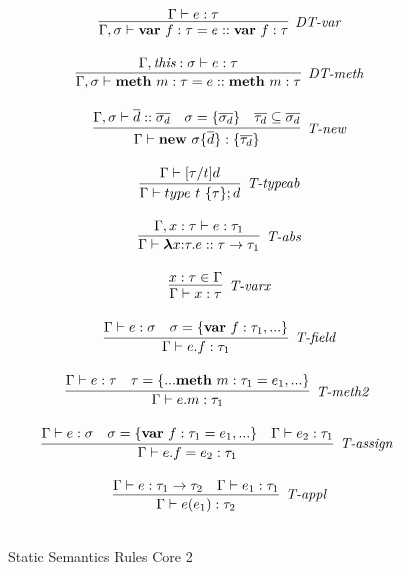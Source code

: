 \begin{figure}
\centering
\[
\begin{array}{c}
\infer[\textit{DT-var}]
	{\Gamma,\sigma \vdash \keyw{var}~ f:\tau = e :: \keyw{var}~ f:\tau }
	{\Gamma \vdash e : \tau} \\[3ex]
	
\infer[\textit{DT-meth}]
	{\Gamma,\sigma \vdash \keyw{meth}~ m:\tau = e :: \keyw{meth}~ m:\tau }
	{\Gamma,\textit{this}:\sigma \vdash e : \tau} \\[3ex]

\infer[\textit{T-new}]
	{\Gamma \vdash \keyw{new}~\sigma \{ \overline{d} \} : \{ \overline{\tau_d} \}}
	{\Gamma,\sigma \vdash \overline{d} :: \overline{\sigma_d} & \sigma = \{ \overline{\sigma_d} \} & \overline{\tau_d} \subseteq \overline{\sigma_d}} \\[3ex]

\infer[\textit{T-typeab}]
	{\Gamma \vdash  type~ t~\{\tau\}; d} 
	{\Gamma \vdash [\tau/t]d }\\[3ex]
	
\infer[\textit{T-abs}]
	{\Gamma \vdash  \boldsymbol\lambda x{:}\tau . e :: \tau \rightarrow \tau_1} 
	{\Gamma, x:\tau \vdash e:\tau_1 }\\[3ex]

\infer[\textit{T-varx}]
	{\Gamma \vdash x:\tau} 
	{x:\tau \in \Gamma }\\[3ex]

\infer[\textit{T-field}]
	{\Gamma \vdash  e.f:\tau_1} 
	{\Gamma \vdash e:\sigma & \sigma= \{\keyw{var}~ f:\tau_1,... \} }\\[3ex]

\infer[\textit{T-meth2 }]
	{\Gamma \vdash  e.m:\tau_1} 
	{\Gamma \vdash e:\tau & \tau=\{...\keyw{meth}~ m:\tau_1=e_1,... \} }\\[3ex]

\infer[\textit{T-assign }]
	{\Gamma \vdash  e.f=e_2:\tau_1} 
	{\Gamma \vdash e:\sigma & \sigma= \{\keyw{var}~ f:\tau_1=e_1,... \} & \Gamma\vdash e_2:\tau_1 }\\[3ex]

\infer[\textit{T-appl}]
	{\Gamma \vdash  e(e_1):\tau_2} 
	{\Gamma \vdash e:\tau_1 \rightarrow \tau_2 & \Gamma \vdash e_1:\tau_1}\\[3ex]

\end{array}
\]
\caption{Static Semantics Rules Core 2}
\end{figure}

